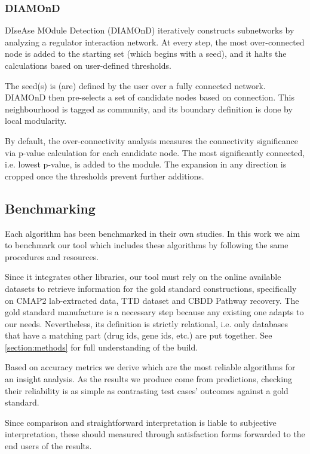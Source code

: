 \subsubsection{DIAMOnD}
DIseAse MOdule Detection (DIAMOnD) \cite{Ghiassian2015AInteractome} iteratively constructs subnetworks by analyzing a regulator interaction network. At every step, the most over-connected node is added to the starting set (which begins with a seed), and it halts the calculations based on user-defined thresholds.

The seed(s) is (are) defined by the user over a fully connected network. DIAMOnD then pre-selects a set of candidate nodes based on connection. This neighbourhood is tagged as community, and its boundary definition is done by local modularity.

By default, the over-connectivity analysis measures the connectivity significance via p-value calculation for each candidate node. The most significantly connected, i.e. lowest p-value, is added to the module. The expansion in any direction is cropped once the thresholds prevent further additions.

\subsection{Benchmarking}
Each algorithm has been benchmarked in their own studies. In this work we aim to benchmark our tool which includes these algorithms by following the same procedures and resources. 

Since it integrates other libraries, our tool must rely on the online available datasets to retrieve information for the gold standard constructions, specifically on CMAP2 lab-extracted data, TTD dataset and CBDD Pathway recovery. The gold standard manufacture is a necessary step because any existing one adapts to our needs. Nevertheless, its definition is strictly relational, i.e. only databases that have a matching part (drug ids, gene ids, etc.) are put together. See \ref{section:methods} for full understanding of the build.

Based on accuracy metrics we derive which are the most reliable algorithms for an insight analysis.  As the results we produce come from predictions, checking their reliability is as simple as contrasting test cases’ outcomes against a gold standard.


Since comparison and straightforward interpretation is liable to subjective interpretation, these should measured through satisfaction forms forwarded to the end users of the results.

